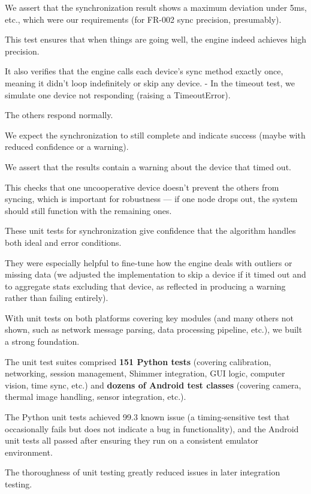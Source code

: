 {{We assert that the synchronization result shows a maximum deviation under 5ms,
etc., which were our requirements (for FR-002 sync precision, presumably).

This test ensures that when things are going well, the engine indeed achieves
high precision.

It also verifies that the engine calls each device's sync method exactly once,
meaning it didn't loop indefinitely or skip any device. - In the timeout test,
we simulate one device not responding (raising a TimeoutError).

The others respond normally.

We expect the synchronization to still complete and indicate success (maybe with
reduced confidence or a warning).

We assert that the results contain a warning about the device that timed out.

This checks that one uncooperative device doesn't prevent the others from
syncing, which is important for robustness --- if one node drops out, the system
should still function with the remaining ones.

These unit tests for synchronization give confidence that the algorithm handles
both ideal and error conditions.

They were especially helpful to fine-tune how the engine deals with outliers or
missing data (we adjusted the implementation to skip a device if it timed out
and to aggregate stats excluding that device, as reflected in producing a
warning rather than failing entirely).

With unit tests on both platforms covering key modules (and many others not
shown, such as network message parsing, data processing pipeline, etc.), we
built a strong foundation.

The unit test suites comprised \textbf{151 Python tests}
(covering calibration, networking, session management, Shimmer integration, GUI logic, computer vision, time sync, etc.) and \textbf{dozens of Android test classes}
 (covering camera, thermal image handling, sensor integration, etc.).

The Python unit tests achieved 99.3%
known issue (a timing-sensitive test that occasionally fails but does not
indicate a bug in functionality), and the Android unit tests all passed after
ensuring they run on a consistent emulator environment.

The thoroughness of unit testing greatly reduced issues in later integration
testing.

}}
